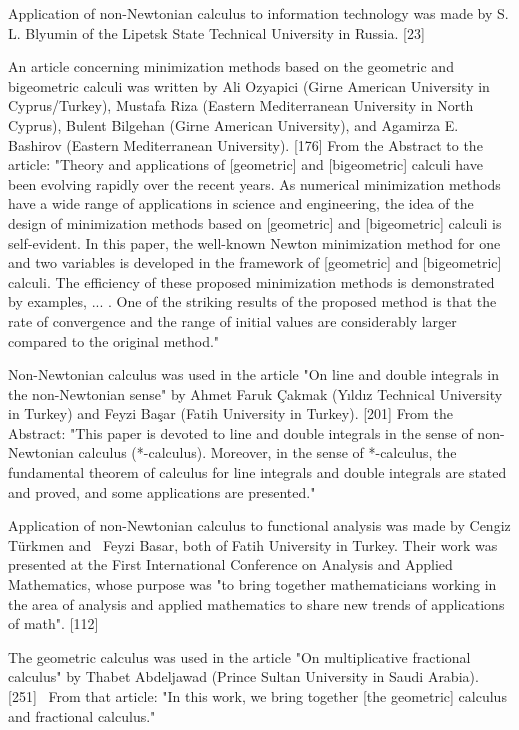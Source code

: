 \documentclass[12pt]{article}
\begin{document}
Application of non-Newtonian calculus to information technology was made by S. L. Blyumin of the Lipetsk State Technical University in Russia. [23]

An article concerning minimization methods based on the geometric and bigeometric calculi was written by Ali Ozyapici (Girne American University in Cyprus/Turkey), Mustafa Riza (Eastern Mediterranean University in North Cyprus), Bulent Bilgehan (Girne American University), and Agamirza E. Bashirov (Eastern Mediterranean University). [176] From the Abstract to the article: "Theory and applications of [geometric] and [bigeometric] calculi have been evolving rapidly over the recent years. As numerical minimization methods have a wide range of applications in science and engineering, the idea of the design of minimization methods based on [geometric] and [bigeometric] calculi is self-evident. In this paper, the well-known Newton minimization method for one and two variables is developed in the framework of [geometric] and [bigeometric] calculi. The efficiency of these proposed minimization methods is demonstrated by examples, ... . One of the striking results of the proposed method is that the rate of convergence and the range of initial values are considerably larger compared to the original method."

Non-Newtonian calculus was used in the article "On line and double integrals in the non-Newtonian sense" by Ahmet Faruk Çakmak (Yıldız Technical University in Turkey) and Feyzi Başar (Fatih University in Turkey). [201] From the Abstract: "This paper is devoted to line and double integrals in the sense of non-Newtonian calculus (*-calculus). Moreover, in the sense of *-calculus, the fundamental theorem of calculus for line integrals and double integrals are stated and proved, and some applications are presented."

Application of non-Newtonian calculus to functional analysis was made by Cengiz Türkmen and  Feyzi Basar, both of Fatih University in Turkey. Their work was presented at the First International Conference on Analysis and Applied Mathematics, whose purpose was "to bring together mathematicians working in the area of analysis and applied mathematics to share new trends of applications of math". [112]

The geometric calculus was used in the article "On multiplicative fractional calculus" by Thabet Abdeljawad (Prince Sultan University in Saudi Arabia). [251]  From that article: "In this work, we bring together [the geometric] calculus and fractional calculus." 
\end{document}
